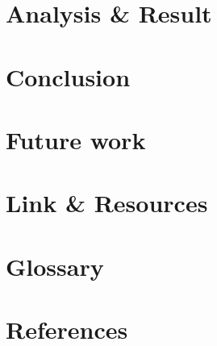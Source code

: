 \documentclass[a4paper,13pt]{article}
\begin{document}
\section{Analysis \& Result}

\section{Conclusion}

\section{Future work}
\clearpage
\section{Link \& Resources}


\section{Glossary}
\printglossary[type=\acronymtype]
\clearpage
\section{References}
\nocite{*}
 
\printbibliography
\end{document}
